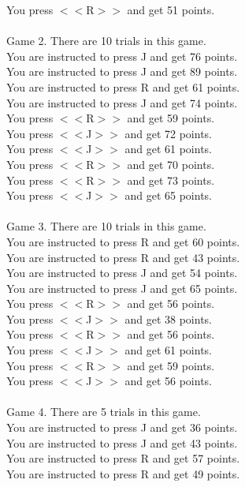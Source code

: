 \documentclass[pdflatex,sn-nature]{sn-jnl}%
\theoremstyle{thmstyleone}%
\theoremstyle{thmstyletwo}%
\theoremstyle{thmstylethree}%
\begin{document}
You press $<<$R$>>$ and get 51 points. $~$\\ 
 $~$\\ 
Game 2. There are 10 trials in this game. $~$\\ 
You are instructed to press J and get 76 points. $~$\\ 
You are instructed to press J and get 89 points. $~$\\ 
You are instructed to press R and get 61 points. $~$\\ 
You are instructed to press J and get 74 points. $~$\\ 
You press $<<$R$>>$ and get 59 points. $~$\\ 
You press $<<$J$>>$ and get 72 points. $~$\\ 
You press $<<$J$>>$ and get 61 points. $~$\\ 
You press $<<$R$>>$ and get 70 points. $~$\\ 
You press $<<$R$>>$ and get 73 points. $~$\\ 
You press $<<$J$>>$ and get 65 points. $~$\\ 
 $~$\\ 
Game 3. There are 10 trials in this game. $~$\\ 
You are instructed to press R and get 60 points. $~$\\ 
You are instructed to press R and get 43 points. $~$\\ 
You are instructed to press J and get 54 points. $~$\\ 
You are instructed to press J and get 65 points. $~$\\ 
You press $<<$R$>>$ and get 56 points. $~$\\ 
You press $<<$J$>>$ and get 38 points. $~$\\ 
You press $<<$R$>>$ and get 56 points. $~$\\ 
You press $<<$J$>>$ and get 61 points. $~$\\ 
You press $<<$R$>>$ and get 59 points. $~$\\ 
You press $<<$J$>>$ and get 56 points. $~$\\ 
 $~$\\ 
Game 4. There are 5 trials in this game. $~$\\ 
You are instructed to press J and get 36 points. $~$\\ 
You are instructed to press J and get 43 points. $~$\\ 
You are instructed to press R and get 57 points. $~$\\ 
You are instructed to press R and get 49 points. $~$\\ 
\end{document}
